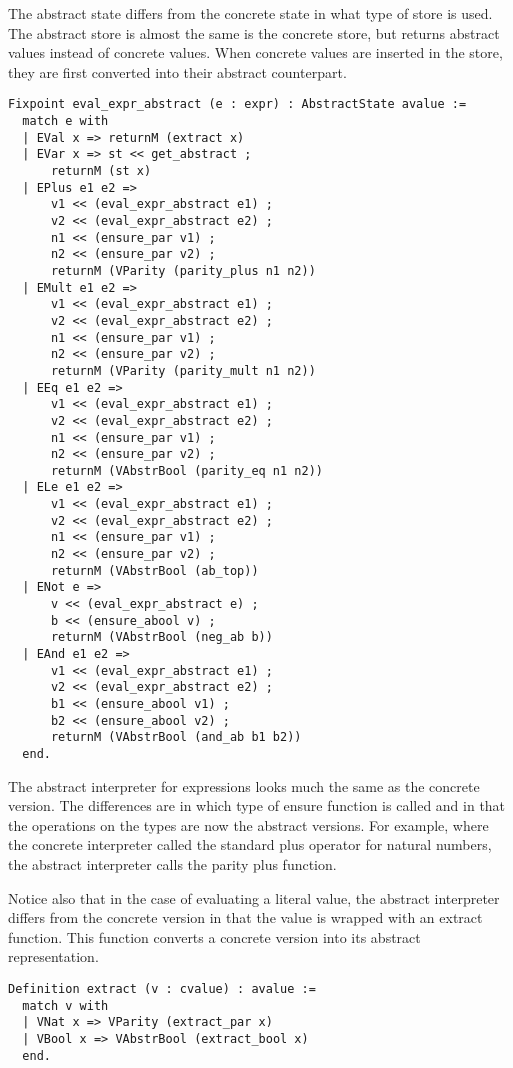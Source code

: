 The abstract state differs from the concrete state in what type of store is
used. The abstract store is almost the same is the concrete store, but returns
abstract values instead of concrete values. When concrete values are inserted
in the store, they are first converted into their abstract counterpart.

\begin{verbatim}
Fixpoint eval_expr_abstract (e : expr) : AbstractState avalue :=
  match e with
  | EVal x => returnM (extract x)
  | EVar x => st << get_abstract ;
      returnM (st x)
  | EPlus e1 e2 => 
      v1 << (eval_expr_abstract e1) ;
      v2 << (eval_expr_abstract e2) ;
      n1 << (ensure_par v1) ;
      n2 << (ensure_par v2) ;
      returnM (VParity (parity_plus n1 n2))
  | EMult e1 e2 =>
      v1 << (eval_expr_abstract e1) ;
      v2 << (eval_expr_abstract e2) ;
      n1 << (ensure_par v1) ;
      n2 << (ensure_par v2) ;
      returnM (VParity (parity_mult n1 n2))
  | EEq e1 e2 =>
      v1 << (eval_expr_abstract e1) ;
      v2 << (eval_expr_abstract e2) ;
      n1 << (ensure_par v1) ;
      n2 << (ensure_par v2) ;
      returnM (VAbstrBool (parity_eq n1 n2))
  | ELe e1 e2 =>
      v1 << (eval_expr_abstract e1) ;
      v2 << (eval_expr_abstract e2) ;
      n1 << (ensure_par v1) ;
      n2 << (ensure_par v2) ;
      returnM (VAbstrBool (ab_top))
  | ENot e =>
      v << (eval_expr_abstract e) ;
      b << (ensure_abool v) ;
      returnM (VAbstrBool (neg_ab b))
  | EAnd e1 e2 =>
      v1 << (eval_expr_abstract e1) ;
      v2 << (eval_expr_abstract e2) ;
      b1 << (ensure_abool v1) ;
      b2 << (ensure_abool v2) ;
      returnM (VAbstrBool (and_ab b1 b2))
  end.
\end{verbatim}

The abstract interpreter for expressions looks much the same as the concrete
version. The differences are in which type of ensure function is called and in
that the operations on the types are now the abstract versions. For example,
where the concrete interpreter called the standard plus operator for natural
numbers, the abstract interpreter calls the parity plus function.

Notice also that in the case of evaluating a literal value, the abstract
interpreter differs from the concrete version in that the value is wrapped with
an extract function. This function converts a concrete version into its
abstract representation.

\begin{verbatim}
Definition extract (v : cvalue) : avalue :=
  match v with
  | VNat x => VParity (extract_par x)
  | VBool x => VAbstrBool (extract_bool x)
  end.
\end{verbatim}


